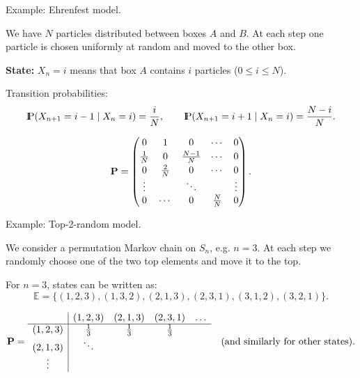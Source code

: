 \documentclass[aspectratio=169]{beamer}
\newcommand{\Prob}{{\rm I\hspace{-0.8mm}P}}
\newcommand{\E}[0]{\mathbb{E}}
\begin{document}
\begin{frame}{Example: Ehrenfest model.}

We have \(N\) particles distributed between boxes \(A\) and \(B\).
At each step one particle is chosen uniformly at random and moved to the other box.

\medskip
\textbf{State:} \(X_n = i\) means that box \(A\) contains \(i\) particles
(\(0 \le i \le N\)).

\begin{center}
\end{center}

Transition probabilities:
\[
\Prob(X_{n+1}=i-1 \mid X_n=i)=\frac{i}{N},\qquad
\Prob(X_{n+1}=i+1 \mid X_n=i)=\frac{N-i}{N}.
\]

\[
\mathbf{P} =
\begin{pmatrix}
0 & 1 & 0 & \cdots & 0\\[2pt]
\frac1N & 0 & \frac{N-1}{N} & \cdots & 0\\[2pt]
0 & \frac2N & 0 & \cdots & 0\\
\vdots & & \ddots & & \vdots\\
0 & \cdots & 0 & \frac{N}{N} & 0
\end{pmatrix}.
\]
\end{frame}


\begin{frame}{Example: Top-2-random model.}

We consider a permutation Markov chain on \(S_n\), e.g. \(n=3\).
At each step we randomly choose one of the two top elements and move it to the top.

\medskip
For \(n=3\), states can be written as:
\[
\E = \{ (1,2,3), (1,3,2), (2,1,3), (2,3,1), (3,1,2), (3,2,1) \}.
\]

\[
\mathbf{P} =
\begin{array}{c|cccccc}
 & (1,2,3) & (2,1,3) & (2,3,1) & \ldots  \\ \hline
(1,2,3) & \tfrac13 & \tfrac13 & \tfrac13 \\
(2,1,3) & \ddots \\
\vdots &
\end{array}
\quad \text{(and similarly for other states)}.
\]

\end{frame}
\end{document}
